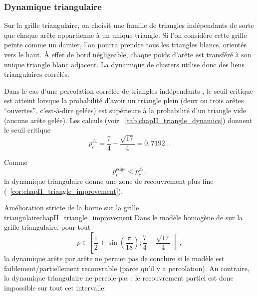 \subsubsection{Dynamique triangulaire}

Sur la grille triangulaire, on choisit une famille de triangles indépendants de sorte que chaque arête appartienne à un unique triangle. Si l'on considère cette grille peinte comme un damier, l'on pourra prendre tous les triangles blancs, orientés vers le haut.
À effet de bord négligeable, chaque poids d'arête est transféré à son unique triangle blanc adjacent. La dynamique de clusters utilise donc des liens triangulaires corrélés.

Dans le cas d'une percolation corrélée de triangles indépendants \cite{PercolationGrilleTrianglesCorrelations}, le seuil critique est atteint lorsque la probabilité d'avoir un triangle plein (deux ou trois arêtes ``ouvertes'', c'est-à-dire gelées) est supérieure à la probabilité d'un triangle vide (aucune arête gelée).
Les calculs (voir \Tab~\ref{tab:chapII_triangle_dynamics}) donnent le seuil critique
\begin{equation}
    p_c^{\triangle}
    =
    \frac74-\frac{\sqrt{17}}4
    =0,7192\ldots
    \label{eq:chapII_pc_triangles}
\end{equation}


Comme
\begin{equation}
    p_c^{\mathrm{edge}}<p_c^{\triangle},
    \label{eq:chapII_pc_comparison}
\end{equation}
la dynamique triangulaire donne une zone de recouvrement plus fine (\Cor~\ref{cor:chapII_triangle_improvement}).

\begin{Corollaire}{Amélioration stricte de la borne sur la grille triangulaire}{chapII_triangle_improvement}
Dans le modèle homogène de \SB{} sur la grille triangulaire, pour tout
\begin{equation}
    p\in
    \left[
    \frac12+\sin\left(\frac\pi{18}\right) ;
    \frac74-\frac{\sqrt{17}}4
    \right[,
    \label{eq:chapII_interval_improvement}
\end{equation}
la dynamique \SW{} arête par arête ne permet pas de conclure si le modèle est faiblement/partiellement recouvrable (parce qu'il y a percolation). Au contraire, la dynamique triangulaire ne percole pas ; le recouvrement partiel est donc impossible sur tout cet intervalle.
\end{Corollaire}

